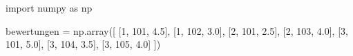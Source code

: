 \documentclass[
  letterpaper,
  DIV=11,
  numbers=noendperiod]{scrreprt}
\newenvironment{Shaded}{\begin{snugshade}}{\end{snugshade}}
\newcommand{\DecValTok}[1]{\textcolor[rgb]{0.68,0.00,0.00}{#1}}
\newcommand{\FloatTok}[1]{\textcolor[rgb]{0.68,0.00,0.00}{#1}}
\newcommand{\ImportTok}[1]{\textcolor[rgb]{0.00,0.46,0.62}{#1}}
\newcommand{\NormalTok}[1]{\textcolor[rgb]{0.00,0.23,0.31}{#1}}
\newcommand{\OperatorTok}[1]{\textcolor[rgb]{0.37,0.37,0.37}{#1}}
\begin{document}
\begin{Shaded}
\begin{Highlighting}[]
\ImportTok{import}\NormalTok{ numpy }\ImportTok{as}\NormalTok{ np}

\NormalTok{bewertungen }\OperatorTok{=}\NormalTok{ np.array([}
\NormalTok{    [}\DecValTok{1}\NormalTok{, }\DecValTok{101}\NormalTok{, }\FloatTok{4.5}\NormalTok{],}
\NormalTok{    [}\DecValTok{1}\NormalTok{, }\DecValTok{102}\NormalTok{, }\FloatTok{3.0}\NormalTok{],}
\NormalTok{    [}\DecValTok{2}\NormalTok{, }\DecValTok{101}\NormalTok{, }\FloatTok{2.5}\NormalTok{],}
\NormalTok{    [}\DecValTok{2}\NormalTok{, }\DecValTok{103}\NormalTok{, }\FloatTok{4.0}\NormalTok{],}
\NormalTok{    [}\DecValTok{3}\NormalTok{, }\DecValTok{101}\NormalTok{, }\FloatTok{5.0}\NormalTok{],}
\NormalTok{    [}\DecValTok{3}\NormalTok{, }\DecValTok{104}\NormalTok{, }\FloatTok{3.5}\NormalTok{],}
\NormalTok{    [}\DecValTok{3}\NormalTok{, }\DecValTok{105}\NormalTok{, }\FloatTok{4.0}\NormalTok{]}
\NormalTok{])}
\end{Highlighting}
\end{Shaded}
\end{document}

